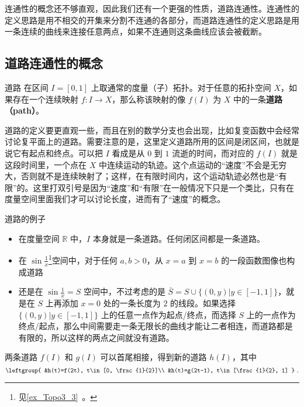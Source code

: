 
连通性的概念还不够直观，因此我们还有一个更强的性质，道路连通性。连通性的定义思路是用不相交的开集来分割不连通的各部分，而道路连通性的定义思路是用一条连续的曲线来连接任意两点，如果不连通则这条曲线应该会被截断。

\subsection{道路连通性的概念}
\begin{definition}{道路}\label{def_Topo4_1}
在区间 $I=[0,1]$ 上取通常的度量（子）拓扑。对于任意的拓扑空间 $X$，如果存在一个连续映射 $f: I\rightarrow X$，那么称该映射的像 $f(I)$ 为 $X$ 中的一条\textbf{道路（path）}。
\end{definition}

道路的定义要更直观一些，而且在别的数学分支也会出现，比如复变函数中会经常讨论复平面上的道路。需要注意的是，这里定义道路所用的区间是闭区间，也就是说它有起点和终点。可以把 $I$ 看成是从 $0$ 到 $1$ 流逝的时间，而对应的 $f(I)$ 就是这段时间里，一个点在 $X$ 中连续运动的轨迹。这个点运动的“速度”不会是无穷大，否则就不是连续映射了；这样，在有限时间内，这个运动轨迹必然也是“有限”的。这里打双引号是因为“速度”和“有限”在一般情况下只是一个类比，只有在度量空间里面我们才可以讨论长度，进而有了“速度”的概念。

\begin{example}{道路的例子}\label{ex_Topo4_1}
\begin{itemize}
\item 在度量空间 $\mathbb{R}$ 中，$I$ 本身就是一条道路。任何闭区间都是一条道路。
\item 在 $\sin{\frac{1}{x}}$\footnote{见\autoref{ex_Topo3_3}~。}空间中，对于任何 $a, b>0$，从 $x=a$ 到 $x=b$ 的一段函数图像也构成道路
\item 还是在 $\sin{\frac{1}{x}}=S$ 空间中，不过考虑的是 $\bar{S}=S\cup\{(0, y)|y\in [-1,1]\}$，就是在 $S$ 上再添加 $x=0$ 处的一条长度为 $2$ 的线段。如果选择 $\{(0, y)|y\in [-1,1]\}$ 上的任意一点作为起点/终点，而选择 $S$ 上的一点作为终点/起点，那么中间需要走一条无限长的曲线才能让二者相连，而道路都是有限的，所以这样的两点之间就没有道路。

\end{itemize}
\end{example}

两条道路 $f(I)$ 和 $g(I)$ 可以首尾相接，得到新的道路 $h(I)$，其中
\begin{equation}
\leftgroup{
&h(t)=f(2t), t\in[0, \frac{1}{2}]\\
&h(t)=g(2t-1), t\in[\frac{1}{2}, 1]
}~.
\end{equation}


